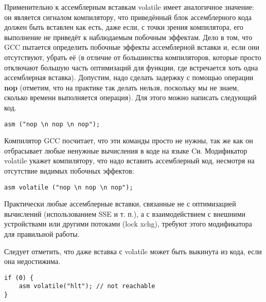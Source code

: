 Применительно к ассемблерным вставкам volatile имеет аналогичное значение:
он является сигналом компилятору, что приведённый блок ассемблерного кода
должен быть вставлен как есть, даже если, с точки зрения компилятора, его
выполнение не приведёт к наблюдаемым побочным эффектам. Дело в том, что GCC
пытается определить побочные эффекты ассемблерной вставки и, если они отсутствуют,
убрать её (в отличие от большинства компиляторов, которые просто отключают большую
часть оптимизаций для функции, где встречается хоть одна ассемблерная вставка).
Допустим, надо сделать задержку с помощью операции \textbf{nop} (отметим, что на практике
так делать нельзя, поскольку мы не знаем, сколько времени выполняется операция).
Для этого можно написать следующий код.
\begin{lstlisting}[language={[x86masm]Assembler}]
asm ("nop \n nop \n nop");
\end{lstlisting}

Компилятор GCC посчитает, что эти команды просто не нужны, так
же как он отбрасывает любые ненужные вычисления в коде на языке Cи.
Модификатор volatile укажет компилятору, что надо вставить ассемблерный код,
несмотря на отсутствие видимых побочных эффектов:
\begin{lstlisting}[language={[x86masm]Assembler}]
asm volatile ("nop \n nop \n nop");
\end{lstlisting}

Практически любые ассемблерные вставки, связанные не с оптимизацией вычислений
(использованием SSE и т. п.), а с взаимодействием с внешними устройствами или
другими потоками (lock xchg), требуют этого модификатора для правильной работы.

Следует отметить, что даже вставка с volatile может быть выкинута
из кода, если она недостижима.
\begin{lstlisting}[language={[x86masm]Assembler}]
if (0) {
	asm volatile("hlt"); // not reachable
}
\end{lstlisting}


